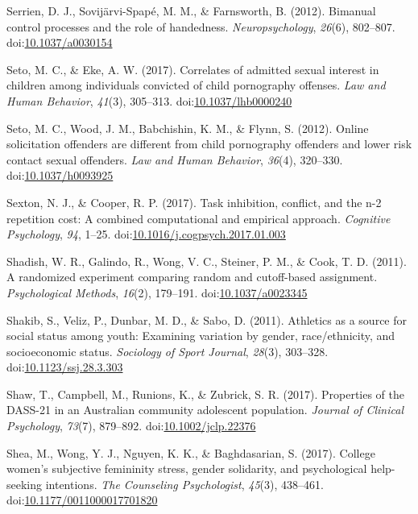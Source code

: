\documentclass[english,man]{apa6}
\theoremstyle{definition}
\theoremstyle{definition}
\theoremstyle{definition}
\theoremstyle{remark}
\begin{document}
\hypertarget{ref-Serrien2012}{}
Serrien, D. J., Sovijärvi-Spapé, M. M., \& Farnsworth, B. (2012).
Bimanual control processes and the role of handedness.
\emph{Neuropsychology}, \emph{26}(6), 802--807.
doi:\href{https://doi.org/10.1037/a0030154}{10.1037/a0030154}

\hypertarget{ref-Seto2017}{}
Seto, M. C., \& Eke, A. W. (2017). Correlates of admitted sexual
interest in children among individuals convicted of child pornography
offenses. \emph{Law and Human Behavior}, \emph{41}(3), 305--313.
doi:\href{https://doi.org/10.1037/lhb0000240}{10.1037/lhb0000240}

\hypertarget{ref-Seto2012}{}
Seto, M. C., Wood, J. M., Babchishin, K. M., \& Flynn, S. (2012). Online
solicitation offenders are different from child pornography offenders
and lower risk contact sexual offenders. \emph{Law and Human Behavior},
\emph{36}(4), 320--330.
doi:\href{https://doi.org/10.1037/h0093925}{10.1037/h0093925}

\hypertarget{ref-Sexton2017}{}
Sexton, N. J., \& Cooper, R. P. (2017). Task inhibition, conflict, and
the n-2 repetition cost: A combined computational and empirical
approach. \emph{Cognitive Psychology}, \emph{94}, 1--25.
doi:\href{https://doi.org/10.1016/j.cogpsych.2017.01.003}{10.1016/j.cogpsych.2017.01.003}

\hypertarget{ref-Shadish2011}{}
Shadish, W. R., Galindo, R., Wong, V. C., Steiner, P. M., \& Cook, T. D.
(2011). A randomized experiment comparing random and cutoff-based
assignment. \emph{Psychological Methods}, \emph{16}(2), 179--191.
doi:\href{https://doi.org/10.1037/a0023345}{10.1037/a0023345}

\hypertarget{ref-Shakib2011}{}
Shakib, S., Veliz, P., Dunbar, M. D., \& Sabo, D. (2011). Athletics as a
source for social status among youth: Examining variation by gender,
race/ethnicity, and socioeconomic status. \emph{Sociology of Sport
Journal}, \emph{28}(3), 303--328.
doi:\href{https://doi.org/10.1123/ssj.28.3.303}{10.1123/ssj.28.3.303}

\hypertarget{ref-Shaw2017}{}
Shaw, T., Campbell, M., Runions, K., \& Zubrick, S. R. (2017).
Properties of the DASS-21 in an Australian community adolescent
population. \emph{Journal of Clinical Psychology}, \emph{73}(7),
879--892.
doi:\href{https://doi.org/10.1002/jclp.22376}{10.1002/jclp.22376}

\hypertarget{ref-Shea2017}{}
Shea, M., Wong, Y. J., Nguyen, K. K., \& Baghdasarian, S. (2017).
College women's subjective femininity stress, gender solidarity, and
psychological help-seeking intentions. \emph{The Counseling
Psychologist}, \emph{45}(3), 438--461.
doi:\href{https://doi.org/10.1177/0011000017701820}{10.1177/0011000017701820}
\end{document}
